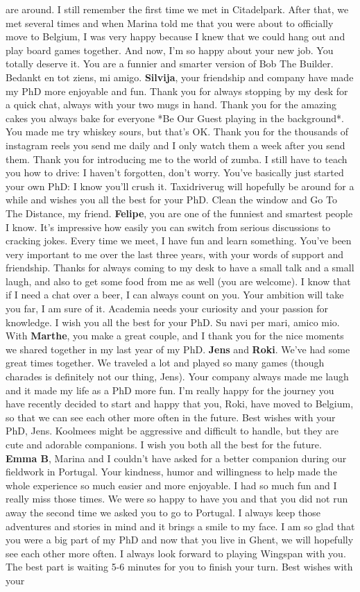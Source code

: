 \documentclass[10pt, twoside]{book} %
\begin{document}
are around. I still remember the first time we met in Citadelpark. After that, we met several times and when Marina told me that you were about to officially move to Belgium, I was very happy because I knew that we could hang out and play board games together. And now, I'm so happy about your new job. You totally deserve it. You are a funnier and smarter version of Bob The Builder. Bedankt en tot ziens, mi amigo. \textbf{Silvija}, your friendship and company have made my PhD more enjoyable and fun. Thank you for always stopping by my desk for a quick chat, always with your two mugs in hand. Thank you for the amazing cakes you always bake for everyone *Be Our Guest playing in the background*. You made me try whiskey sours, but that's OK. Thank you for the thousands of instagram reels you send me daily and I only watch them a week after you send them. Thank you for introducing me to the world of zumba. I still have to teach you how to drive: I haven't forgotten, don't worry. You've basically just started your own PhD: I know you'll crush it. Taxidriverug will hopefully be around for a while and wishes you all the best for your PhD. Clean the window and Go To The Distance, my friend. \textbf{Felipe}, you are one of the funniest and smartest people I know. It's impressive how easily you can switch from serious discussions to cracking jokes. Every time we meet, I have fun and learn something. You’ve been very important to me over the last three years, with your words of support and friendship. Thanks for always coming to my desk to have a small talk and a small laugh, and also to get some food from me as well (you are welcome). I know that if I need a chat over a beer, I can always count on you. Your ambition will take you far, I am sure of it. Academia needs your curiosity and your passion for knowledge. I wish you all the best for your PhD. Su navi per mari, amico mio. With \textbf{Marthe}, you make a great couple, and I thank you for the nice moments we shared together in my last year of my PhD. \textbf{Jens} and \textbf{Roki}. We've had some great times together. We traveled a lot and played so many games (though charades is definitely not our thing, Jens). Your company always made me laugh and it made my life as a PhD more fun. I'm really happy for the journey you have recently decided to start and happy that you, Roki, have moved to Belgium, so that we can see each other more often in the future. Best wishes with your PhD, Jens. Koolmees might be aggressive and difficult to handle, but they are cute and adorable companions. I wish you both all the best for the future. \textbf{Emma B}, Marina and I couldn't have asked for a better companion during our fieldwork in Portugal. Your kindness, humor and willingness to help made the whole experience so much easier and more enjoyable. I had so much fun and I really miss those times. We were so happy to have you and that you did not run away the second time we asked you to go to Portugal. I always keep those adventures and stories in mind and it brings a smile to my face. I am so glad that you were a big part of my PhD and now that you live in Ghent, we will hopefully see each other more often. I always look forward to playing Wingspan with you. The best part is waiting 5-6 minutes for you to finish your turn. Best wishes with your 
\end{document}
